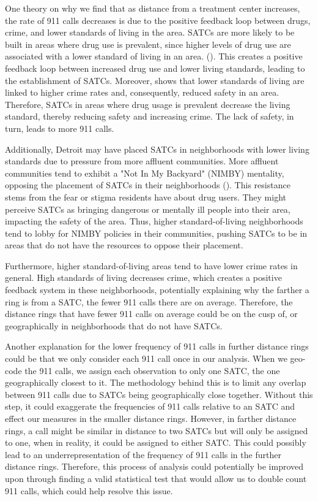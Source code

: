 \documentclass[12pt]{article}
\begin{document}
One theory on why we find that as distance from a treatment center increases, the rate of 911 calls decreases is due to the positive feedback loop between drugs, crime, and lower standards of living in the area. SATCs are more likely to be built in areas where drug use is prevalent, since higher levels of drug use are associated with a lower standard of living in an area. (\cite{drugs_and_crime}). This creates a positive feedback loop between increased drug use and lower living standards, leading to the establishment of SATCs. Moreover, \cite{drugs_and_crime} shows that lower standards of living are linked to higher crime rates and, consequently, reduced safety in an area. Therefore, SATCs in areas where drug usage is prevalent decrease the living standard, thereby reducing safety and increasing crime. The lack of safety, in turn, leads to more 911 calls.  

Additionally, Detroit may have placed SATCs in neighborhoods with lower living standards due to pressure from more affluent communities. More affluent communities tend to exhibit a "Not In My Backyard" (NIMBY) mentality, opposing the placement of SATCs in their neighborhoods (\cite{NIMBY}). This resistance stems from the fear or stigma residents have about drug users. They might perceive SATCs as bringing dangerous or mentally ill people into their area, impacting the safety of the area. Thus, higher standard-of-living neighborhoods tend to lobby for NIMBY policies in their communities, pushing SATCs to be in areas that do not have the resources to oppose their placement.

Furthermore, higher standard-of-living areas tend to have lower crime rates in general. High standards of living decreases crime, which creates a positive feedback system in these neighborhoods, potentially explaining why the farther a ring is from a SATC, the fewer 911 calls there are on average. Therefore, the distance rings that have fewer 911 calls on average could be on the cusp of, or geographically in neighborhoods that do not have SATCs. 
    
Another explanation for the lower frequency of 911 calls in further distance rings could be that we only consider each 911 call once in our analysis. When we geo-code the 911 calls, we assign each observation to only one SATC, the one geographically closest to it. The methodology behind this is to limit any overlap between 911 calls due to SATCs being geographically close together. Without this step, it could exaggerate the frequencies of 911 calls relative to an SATC and effect our measures in the smaller distance rings.  However, in farther distance rings, a call might be similar in distance to two SATCs but will only be assigned to one, when in reality, it could be assigned to either SATC. This could possibly lead to an underrepresentation of the frequency of 911 calls in the further distance rings. Therefore, this process of analysis could potentially be improved upon through finding a valid statistical test that would allow us to double count 911 calls, which could help resolve this issue. 
\end{document}
